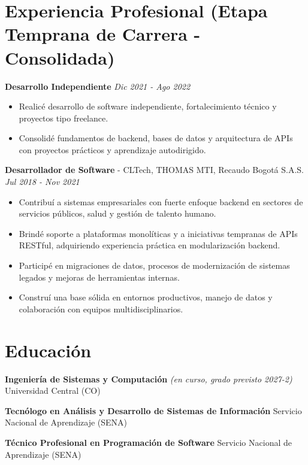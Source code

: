 \documentclass[9pt,letterpaper]{extarticle}
\begin{document}
	\section*{Experiencia Profesional (Etapa Temprana de Carrera - Consolidada)}
	
	\textbf{Desarrollo Independiente}
	\hfill \textit{Dic 2021 - Ago 2022}
	\begin{itemize}
		\item Realicé desarrollo de software independiente, fortalecimiento técnico y proyectos tipo freelance.
		\item Consolidé fundamentos de backend, bases de datos y arquitectura de APIs con proyectos prácticos y aprendizaje autodirigido.
	\end{itemize}
	
	\textbf{Desarrollador de Software} - {CLTech, THOMAS MTI, Recaudo Bogotá S.A.S.}
	\hfill \textit{Jul 2018 - Nov 2021}
	\begin{itemize}
		\item Contribuí a sistemas empresariales con fuerte enfoque backend en sectores de servicios públicos, salud y gestión de talento humano.
		\item Brindé soporte a plataformas monolíticas y a iniciativas tempranas de APIs RESTful, adquiriendo experiencia práctica en modularización backend.
		\item Participé en migraciones de datos, procesos de modernización de sistemas legados y mejoras de herramientas internas.
		\item Construí una base sólida en entornos productivos, manejo de datos y colaboración con equipos multidisciplinarios.
	\end{itemize}
	
	
	\section*{Educación}
	
		\textbf{Ingeniería de Sistemas y Computación}
		\textit{(en curso, grado previsto 2027-2)}
		\hfill {Universidad Central (CO)}
		
		\textbf{Tecnólogo en Análisis y Desarrollo de Sistemas de Información}
		\hfill {Servicio Nacional de Aprendizaje (SENA)}
		
		\textbf{Técnico Profesional en Programación de Software}
		\hfill {Servicio Nacional de Aprendizaje (SENA)}
	
\end{document}
